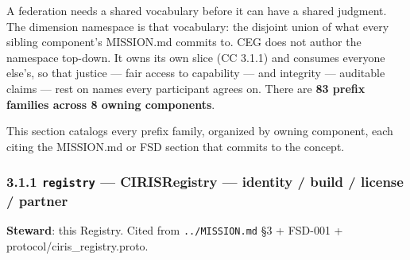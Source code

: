 \documentclass[11pt]{article}
\begin{document}
A federation needs a shared vocabulary before it can have a shared judgment. The dimension namespace is that vocabulary: the disjoint union of what every sibling component's MISSION.md commits to. CEG does not author the namespace top-down. It owns its own slice (CC 3.1.1) and consumes everyone else's, so that justice — fair access to capability — and integrity — auditable claims — rest on names every participant agrees on. There are \textbf{83 prefix families across 8 owning components}.


This section catalogs every prefix family, organized by owning component, each citing the MISSION.md or FSD section that commits to the concept.


\subsubsection*{3.1.1 \texttt{registry} — CIRISRegistry — identity / build / license / partner}


\textbf{Steward}: this Registry. Cited from \texttt{../MISSION.md} §3 + FSD-001 + protocol/ciris\_registry.proto.
\end{document}
